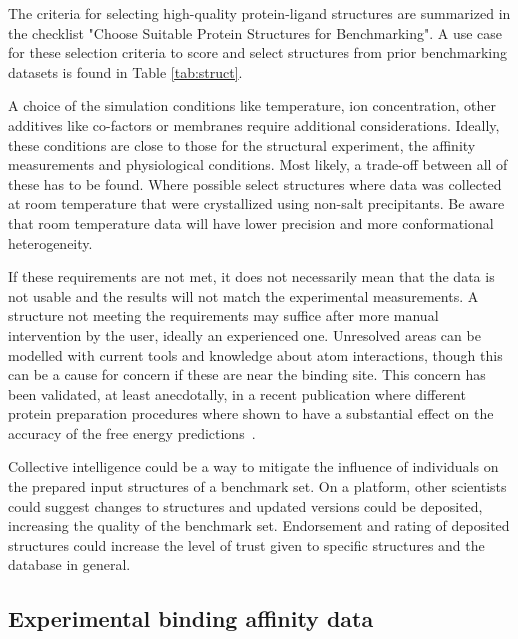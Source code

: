 \documentclass[9pt,bestpractices]{livecoms}
\begin{document}
The criteria for selecting high-quality protein-ligand structures are summarized in the checklist "Choose Suitable Protein Structures for Benchmarking". A use case for these selection criteria to score and select structures from prior benchmarking datasets is found in Table \ref{tab:struct}.

A choice of the simulation conditions like temperature, ion concentration, other additives like co-factors or membranes require additional considerations. Ideally, these conditions are close to those for the structural experiment, the affinity measurements and physiological conditions. Most likely, a trade-off between all of these has to be found. Where possible select structures where data was collected at room temperature that were crystallized using non-salt precipitants. Be aware that room temperature data will have lower precision and more conformational heterogeneity.
    
%
If these requirements are not met, it does not necessarily mean that the data is not usable and the results will not match the experimental measurements. A structure not meeting the requirements may suffice after more manual intervention by the user, ideally an experienced one. Unresolved areas can be modelled with current tools and knowledge about atom interactions, though this can be a cause for concern if these are near the binding site. This concern has been validated, at least anecdotally, in a recent publication where different protein preparation procedures where shown to have a substantial effect on the accuracy of the free energy predictions~\cite{shih_impact_2020}.


Collective intelligence could be a way to mitigate the influence of individuals on the prepared input structures of a benchmark set. On a platform, other scientists could suggest changes to structures and updated versions could be deposited, increasing the quality of the benchmark set. Endorsement and rating of deposited structures could increase the level of trust given to specific structures and the database in general.


\subsection{Experimental binding affinity data}
\label{sec:affinities}
\end{document}
